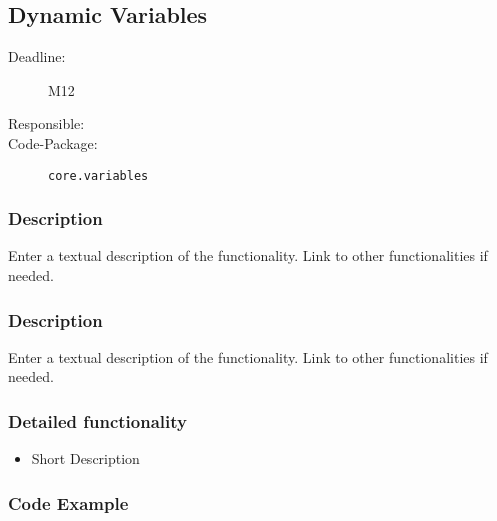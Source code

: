 \newpage
\subsection{Dynamic Variables}
\label{Functionality:ID}

\begin{description}
\item[Deadline:] M12
\item[Responsible:]
\item[Code-Package:] \texttt{core.variables}
\end{description}

\subsubsection*{Description}

Enter a textual description of the functionality. Link to other functionalities if needed. 


\subsubsection*{Description}

Enter a textual description of the functionality. Link to other functionalities if needed. 

\subsubsection*{Detailed functionality}

\begin{itemize}
\item Short Description
\end{itemize}

\subsubsection*{Code Example}


